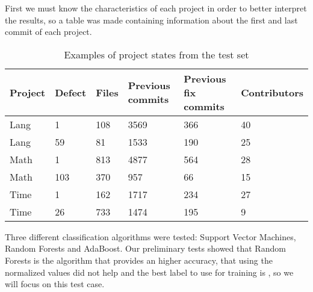 First we must know the characteristics of each project in order to better interpret the results, so a table was made containing information about the first and last commit of each
project.
%
\begin{table}[H]
\centering
\begin{tabular}{|l|l|l|l|l|l|}
\hline
\textbf{Project} & \textbf{Defect} & \textbf{Files} & \textbf{Previous commits} & \textbf{Previous fix commits} & \textbf{Contributors} \\ \hline
Lang             & 1               & 108            & 3569                      & 366                           & 40                    \\ \hline
Lang             & 59              & 81             & 1533                      & 190                           & 25                    \\ \hline
Math             & 1               & 813            & 4877                      & 564                           & 28                    \\ \hline
Math             & 103             & 370            & 957                       & 66                            & 15                    \\ \hline
Time             & 1               & 162            & 1717                      & 234                           & 27                    \\ \hline
Time             & 26              & 733            & 1474                      & 195                           & 9                     \\ \hline
\end{tabular}
\caption{Examples of project states from the test set}
\label{test-set-examples}
\end{table}

Three different classification algorithms were tested: Support Vector Machines, Random Forests and AdaBoost.
Our preliminary tests showed that Random Forests is the algorithm that provides an higher accuracy, that using the normalized values did not help and the best label to use for training is , so we will focus on this test case.


